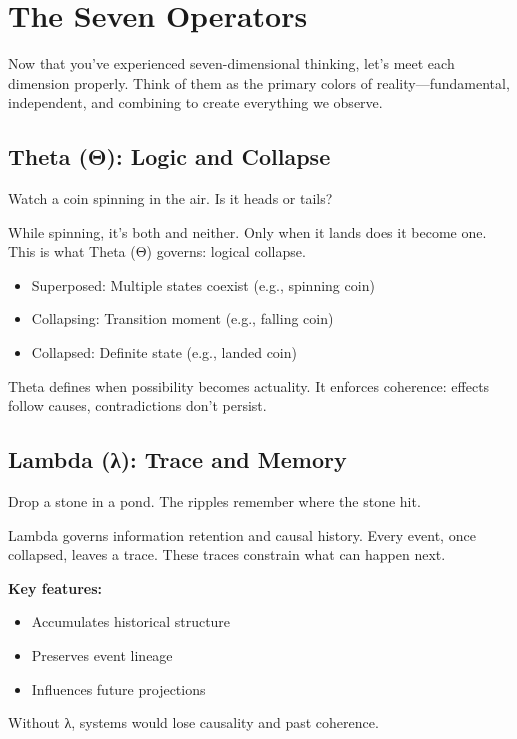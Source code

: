 
\chapter{The Seven Operators}

Now that you've experienced seven-dimensional thinking, let's meet each dimension properly. Think of them as the primary colors of reality—fundamental, independent, and combining to create everything we observe.

\section{Theta (Θ): Logic and Collapse}

Watch a coin spinning in the air. Is it heads or tails?

While spinning, it's both and neither. Only when it lands does it become one. This is what Theta (Θ) governs: logical collapse.

\begin{itemize}
\item Superposed: Multiple states coexist (e.g., spinning coin)
\item Collapsing: Transition moment (e.g., falling coin)
\item Collapsed: Definite state (e.g., landed coin)
\end{itemize}

Theta defines when possibility becomes actuality. It enforces coherence: effects follow causes, contradictions don’t persist.

\section{Lambda (λ): Trace and Memory}

Drop a stone in a pond. The ripples remember where the stone hit.

Lambda governs information retention and causal history. Every event, once collapsed, leaves a trace. These traces constrain what can happen next.

\textbf{Key features:}
\begin{itemize}
\item Accumulates historical structure
\item Preserves event lineage
\item Influences future projections
\end{itemize}

Without λ, systems would lose causality and past coherence.

